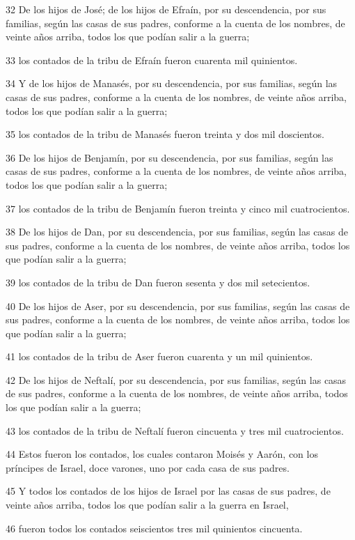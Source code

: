 \par 32 De los hijos de José; de los hijos de Efraín, por su descendencia, por sus familias, según las casas de sus padres, conforme a la cuenta de los nombres, de veinte años arriba, todos los que podían salir a la guerra;
\par 33 los contados de la tribu de Efraín fueron cuarenta mil quinientos.
\par 34 Y de los hijos de Manasés, por su descendencia, por sus familias, según las casas de sus padres, conforme a la cuenta de los nombres, de veinte años arriba, todos los que podían salir a la guerra;
\par 35 los contados de la tribu de Manasés fueron treinta y dos mil doscientos. 
\par 36 De los hijos de Benjamín, por su descendencia, por sus familias, según las casas de sus padres, conforme a la cuenta de los nombres, de veinte años arriba, todos los que podían salir a la guerra;
\par 37 los contados de la tribu de Benjamín fueron treinta y cinco mil cuatrocientos.
\par 38 De los hijos de Dan, por su descendencia, por sus familias, según las casas de sus padres, conforme a la cuenta de los nombres, de veinte años arriba, todos los que podían salir a la guerra;
\par 39 los contados de la tribu de Dan fueron sesenta y dos mil setecientos.
\par 40 De los hijos de Aser, por su descendencia, por sus familias, según las casas de sus padres, conforme a la cuenta de los nombres, de veinte años arriba, todos los que podían salir a la guerra;
\par 41 los contados de la tribu de Aser fueron cuarenta y un mil quinientos.
\par 42 De los hijos de Neftalí, por su descendencia, por sus familias, según las casas de sus padres, conforme a la cuenta de los nombres, de veinte años arriba, todos los que podían salir a la guerra;
\par 43 los contados de la tribu de Neftalí fueron cincuenta y tres mil cuatrocientos.
\par 44 Estos fueron los contados, los cuales contaron Moisés y Aarón, con los príncipes de Israel, doce varones, uno por cada casa de sus padres.
\par 45 Y todos los contados de los hijos de Israel por las casas de sus padres, de veinte años arriba, todos los que podían salir a la guerra en Israel,
\par 46 fueron todos los contados seiscientos tres mil quinientos cincuenta.


